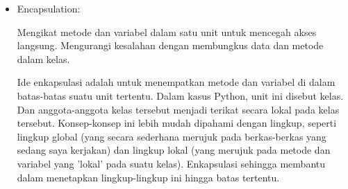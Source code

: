 \documentclass{article}
\begin{document}
\begin{itemize}
          Dalam hal ini, operator * menunjukkan polimorfisme. Fungsinya berbeda-beda tergantung pada jenis objek yang diterapkan padanya:

          Ketika diterapkan pada string, operator ini mengulang string tersebut.

          Ketika diterapkan pada bilangan bulat, operator ini melakukan perkalian.

          Ketika diterapkan pada daftar, operator ini mengulang daftar tersebut.

          Ini merupakan contoh polimorfisme karena operator yang sama (*) berperilaku berbeda-beda tergantung pada jenis objek yang diterapkan padanya.

          Contoh lain:
          \begin{lstlisting}[language=Python, caption={}, captionpos=b]
string = "poly"
sequence = [1,2,3]
print(len(string))
print(len(sequence))
          \end{lstlisting}
          Outputnya adalah:
          \begin{lstlisting}[language=Python, caption={}, captionpos=b]
4
3
          \end{lstlisting}
          Dalam contoh ini, fungsi \verb|len()| bersifat polimorfik karena menghitung panjang berbagai jenis objek:

          Untuk string "poly", fungsi ini mengembalikan 4 karena string tersebut terdiri dari 4 karakter.

          Untuk daftar \verb|[1, 2, 3]|, fungsi ini mengembalikan 3 karena terdapat 3 elemen dalam daftar.

          Meskipun \verb|len()| adalah fungsi yang sama, fungsinya bekerja secara berbeda tergantung pada jenis objek yang diberikan kepadanya.


    \item Encapsulation:

          Mengikat metode dan variabel dalam satu unit untuk mencegah akses langsung. Mengurangi kesalahan dengan membungkus data dan metode dalam kelas.

          Ide enkapsulasi adalah untuk menempatkan metode dan variabel di dalam batas-batas suatu unit tertentu. Dalam kasus Python, unit ini disebut kelas. Dan anggota-anggota kelas tersebut menjadi terikat secara lokal pada kelas tersebut. Konsep-konsep ini lebih mudah dipahami dengan lingkup, seperti lingkup global (yang secara sederhana merujuk pada berkas-berkas yang sedang saya kerjakan) dan lingkup lokal (yang merujuk pada metode dan variabel yang 'lokal' pada suatu kelas). Enkapsulasi sehingga membantu dalam menetapkan lingkup-lingkup ini hingga batas tertentu.


\end{itemize}
\end{document}
